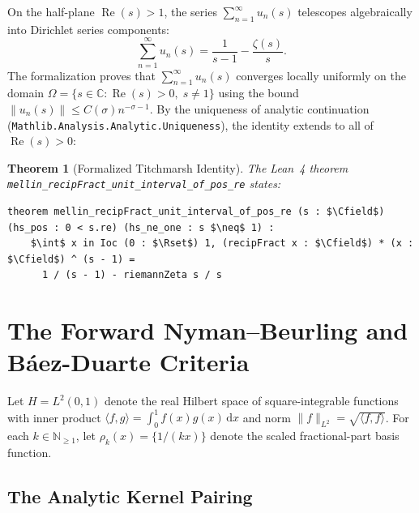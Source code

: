 \documentclass[11pt,a4paper]{article}
\newtheorem{theorem}{Theorem}[section]
\theoremstyle{definition}
\newcommand{\dee}{\mathrm{d}}
\newcommand{\Nset}{\mathbb{N}}
\newcommand{\Rset}{\mathbb{R}}
\newcommand{\Cfield}{\mathbb{C}}
\begin{document}
On the half-plane $\operatorname{Re}(s) > 1$, the series $\sum_{n=1}^\infty u_n(s)$ telescopes algebraically into Dirichlet series components:
\begin{equation}
\sum_{n=1}^\infty u_n(s) = \frac{1}{s - 1} - \frac{\zeta(s)}{s}.
\end{equation}
The formalization proves that $\sum_{n=1}^\infty u_n(s)$ converges locally uniformly on the domain $\Omega = \{s \in \Cfield : \operatorname{Re}(s) > 0, \; s \neq 1\}$ using the bound $\|u_n(s)\| \le C(\sigma) n^{-\sigma-1}$. By the uniqueness of analytic continuation (\texttt{Mathlib.Analysis.Analytic.Uniqueness}), the identity extends to all of $\operatorname{Re}(s) > 0$:

\begin{theorem}[Formalized Titchmarsh Identity]\label{thm:formal_titchmarsh}
The Lean~4 theorem \texttt{mellin\_recipFract\_}\allowbreak\texttt{unit\_interval\_of\_pos\_re} states:
\begin{lstlisting}
theorem mellin_recipFract_unit_interval_of_pos_re (s : $\Cfield$) (hs_pos : 0 < s.re) (hs_ne_one : s $\neq$ 1) :
    $\int$ x in Ioc (0 : $\Rset$) 1, (recipFract x : $\Cfield$) * (x : $\Cfield$) ^ (s - 1) =
      1 / (s - 1) - riemannZeta s / s
\end{lstlisting}
\end{theorem}

\section{The Forward Nyman--Beurling and B\'aez-Duarte Criteria}

Let $H = L^2(0, 1)$ denote the real Hilbert space of square-integrable functions with inner product $\langle f, g \rangle = \int_0^1 f(x)g(x)\,\dee x$ and norm $\|f\|_{L^2} = \sqrt{\langle f, f \rangle}$. For each $k \in \Nset_{\ge 1}$, let $\rho_k(x) = \{ 1 / (kx) \}$ denote the scaled fractional-part basis function.

\subsection{The Analytic Kernel Pairing}
\end{document}
